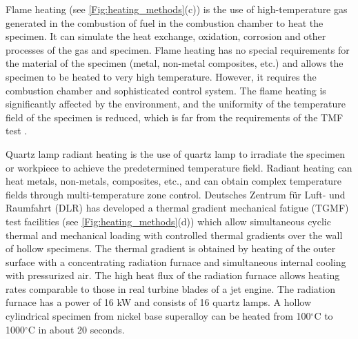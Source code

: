 Flame heating (see \ref{Fig:heating_methods}(c)) is the use of high-temperature gas generated in the combustion of fuel in the combustion chamber to heat the specimen. It can simulate the heat exchange, oxidation, corrosion and other processes of the gas and specimen. Flame heating has no special requirements for the material of the specimen (metal, non-metal composites, etc.) and allows the specimen to be heated to very high temperature. However, it requires the combustion chamber and sophisticated control system. The flame heating is significantly affected by the environment, and the uniformity of the temperature field of the specimen is reduced, which is far from the requirements of the TMF test \cite{MAUGET2017225}.

Quartz lamp radiant heating is the use of quartz lamp to irradiate the specimen or workpiece to achieve the predetermined temperature field. Radiant heating can heat metals, non-metals, composites, etc., and can obtain complex temperature fields through multi-temperature zone control.
Deutsches Zentrum f\"{u}r Luft- und Raumfahrt (DLR) \cite{BAUFELD2008219} has developed a thermal gradient mechanical fatigue (TGMF) test facilities (see \ref{Fig:heating_methods}(d)) which allow simultaneous cyclic thermal and mechanical loading with controlled thermal gradients over the wall of hollow specimens. The thermal gradient is obtained by heating of the outer surface with a concentrating radiation furnace and simultaneous internal cooling with pressurized air. The high heat flux of the radiation furnace allows heating rates comparable to those in real turbine blades of a jet engine. The radiation furnace has a power of 16 kW and consists of 16 quartz lamps. A hollow cylindrical specimen from nickel base superalloy can be heated from 100$^\circ$C to 1000$^\circ$C in about 20 seconds. 

